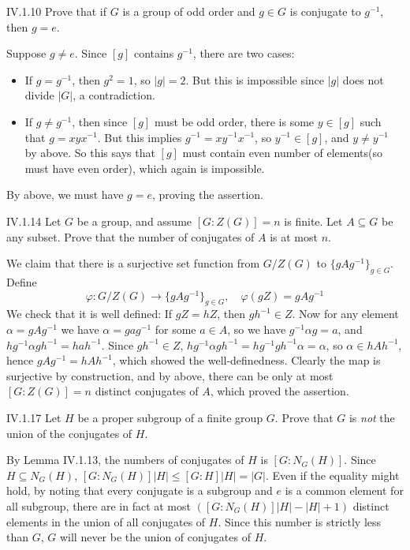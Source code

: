 \begin{problem}{IV.1.10}
Prove that if $G$ is a group of odd order and $g \in G$ is conjugate to $g^{-1}$, then $g = e$.
\end{problem}
\begin{pf}
Suppose $g \neq e$. Since $[g]$ contains $g^{-1}$, there are two cases:
\begin{itemize}
    \item If $g = g^{-1}$, then $g^2 = 1$, so $|g| = 2$. But this is impossible since $|g|$ does not divide $|G|$, a contradiction.
    \item If $g \neq g^{-1}$, then since $[g]$ must be odd order, there is some $y \in [g]$ such that $g = xyx^{-1}$. But this implies $g^{-1} = xy^{-1}x^{-1}$, so $y^{-1} \in [g]$, and $y \neq y^{-1}$ by above. So this says that $[g]$ must contain even number of elements(so must have even order), which again is impossible. 
\end{itemize} 
By above, we must have $g = e$, proving the assertion.
\end{pf}

\begin{problem}{IV.1.14}
Let $G$ be a group, and assume $[G : Z(G)] = n$ is finite. Let $A \subseteq G$ be any subset. Prove that the number of conjugates of $A$ is at most $n$.
\end{problem}
\begin{pf}
We claim that there is a surjective set function from $G/Z(G)$ to $\{gAg^{-1}\}_{g \in G}$. Define
\[
\varphi : G/Z(G) \to \{gAg^{-1}\}_{g \in G}, \quad \varphi(gZ) = gAg^{-1}
\]
We check that it is well defined: If $gZ = hZ$, then $gh^{-1} \in Z$. Now for any element $\alpha = gAg^{-1}$ we have $\alpha = gag^{-1}$ for some $a \in A$, so we have $g^{-1}\alpha g = a$, and $hg^{-1} \alpha gh^{-1} = hah^{-1}$. Since $gh^{-1} \in Z$, $hg^{-1} \alpha gh^{-1} = hg^{-1} gh^{-1} \alpha = \alpha$, so $\alpha \in hAh^{-1}$, hence $gAg^{-1} = hAh^{-1}$, which showed the well-definedness. Clearly the map is surjective by construction, and by above, there can be only at most $[G:Z(G)] = n$ distinct conjugates of $A$, which proved the assertion.
\end{pf}


\begin{problem}{IV.1.17}
Let $H$ be a proper subgroup of a finite group $G$. Prove that $G$ is \emph{not} the union of the conjugates of $H$.
\end{problem}
\begin{pf}
By Lemma IV.1.13, the numbers of conjugates of $H$ is $[G:N_G(H)]$. Since $H \subseteq N_G(H)$, $[G:N_G(H)]|H| \leq [G:H]|H| = |G|$. Even if the equality might hold, by noting that every conjugate is a subgroup and $e$ is a common element for all subgroup, there are in fact at most $([G:N_G(H)]|H| - |H| + 1)$ distinct elements in the union of all conjugates of $H$. Since this number is strictly less than $G$, $G$ will never be the union of conjugates of $H$.
\end{pf}

